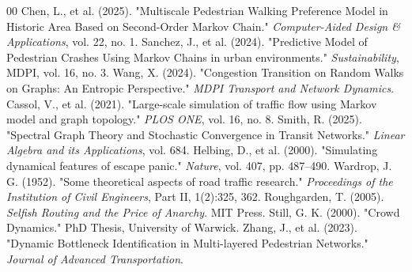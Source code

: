 \documentclass[conference]{IEEEtran}
\begin{document}
\begin{thebibliography}{00}
 Chen, L., et al. (2025). "Multiscale Pedestrian Walking Preference Model in Historic Area Based on Second-Order Markov Chain." \textit{Computer-Aided Design \& Applications}, vol. 22, no. 1.
 Sanchez, J., et al. (2024). "Predictive Model of Pedestrian Crashes Using Markov Chains in urban environments." \textit{Sustainability}, MDPI, vol. 16, no. 3.
 Wang, X. (2024). "Congestion Transition on Random Walks on Graphs: An Entropic Perspective." \textit{MDPI Transport and Network Dynamics}.
 Cassol, V., et al. (2021). "Large-scale simulation of traffic flow using Markov model and graph topology." \textit{PLOS ONE}, vol. 16, no. 8.
 Smith, R. (2025). "Spectral Graph Theory and Stochastic Convergence in Transit Networks." \textit{Linear Algebra and its Applications}, vol. 684.
 Helbing, D., et al. (2000). "Simulating dynamical features of escape panic." \textit{Nature}, vol. 407, pp. 487--490.
 Wardrop, J. G. (1952). "Some theoretical aspects of road traffic research." \textit{Proceedings of the Institution of Civil Engineers}, Part II, 1(2):325, 362.
 Roughgarden, T. (2005). \textit{Selfish Routing and the Price of Anarchy}. MIT Press.
 Still, G. K. (2000). "Crowd Dynamics." PhD Thesis, University of Warwick.
 Zhang, J., et al. (2023). "Dynamic Bottleneck Identification in Multi-layered Pedestrian Networks." \textit{Journal of Advanced Transportation}.
\end{thebibliography}
\end{document}
